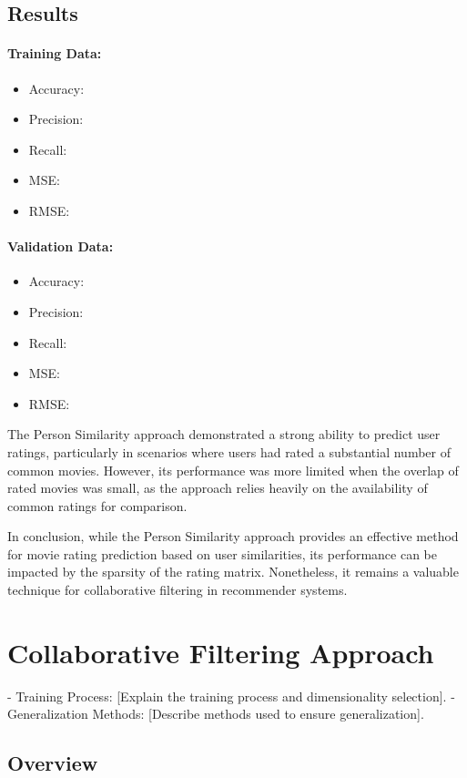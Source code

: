\documentclass[a4paper,10pt]{article}
\begin{document}
\subsection{Results}
\paragraph{Training Data:}
\begin{itemize}
    \item Accuracy:
    \item Precision:
    \item Recall:
    \item MSE:
    \item RMSE:
\end{itemize}

\paragraph{Validation Data:}
\begin{itemize}
    \item Accuracy:
    \item Precision:
    \item Recall:
    \item MSE:
    \item RMSE:
\end{itemize}

The Person Similarity approach demonstrated a strong ability to predict user ratings, particularly in scenarios where users had rated a substantial number of common movies. However, its performance was more limited when the overlap of rated movies was small, as the approach relies heavily on the availability of common ratings for comparison.

In conclusion, while the Person Similarity approach provides an effective method for movie rating prediction based on user similarities, its performance can be impacted by the sparsity of the rating matrix. Nonetheless, it remains a valuable technique for collaborative filtering in recommender systems.

\section{Collaborative Filtering Approach}
- Training Process: [Explain the training process and dimensionality selection].
- Generalization Methods: [Describe methods used to ensure generalization].
\subsection{Overview}
\end{document}
